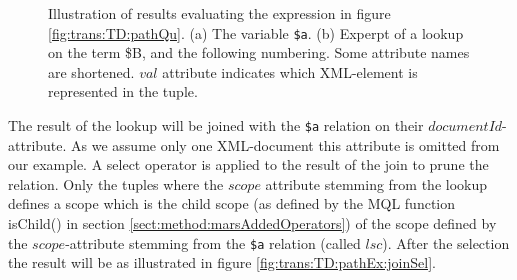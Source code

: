 \begin{myExample}
\begin{figure}[h]
\centering
{}
\qquad
{}
\caption[Evaluating the expression of figure \ref{fig:trans:TD:pathQu}]{Illustration of results evaluating the
expression in figure \ref{fig:trans:TD:pathQu}. (a) The variable \texttt{\$a}. (b) Experpt of a lookup on the term
\textsf{\$B}, and the following numbering. Some attribute names are shortened. $val$ attribute indicates which
XML-element is represented in the tuple.
\label{fig:trans:TD:pathEx}}
\end{figure}

The result of the lookup will be joined with the \texttt{\$a} relation on their $documentId$-attribute. As we
assume only one XML-document this attribute is omitted from our example. A \textsf{select} operator is applied to
the result of the join to prune the relation. Only the tuples where the $scope$ attribute stemming from the lookup
defines a scope which is the child scope (as defined by the MQL function \textsf{isChild() in section
\ref{sect:method:marsAddedOperators}}) of the scope defined by the $scope$-attribute stemming from the
\texttt{\$a} relation (called $lsc$). After the selection the result will be as illustrated in figure
\ref{fig:trans:TD:pathEx:joinSel}.


\end{myExample}

